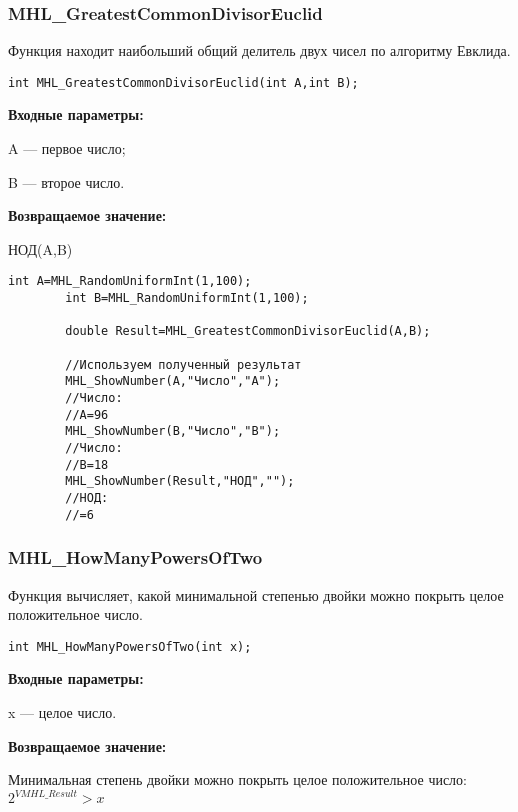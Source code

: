 \documentclass[a4paper,12pt]{article}
\begin{document}
\subsubsection{MHL\_GreatestCommonDivisorEuclid}\label{MHL_GreatestCommonDivisorEuclid}

Функция находит наибольший общий делитель двух чисел по алгоритму Евклида.


\begin{lstlisting}[label=code_syntax_MHL_GreatestCommonDivisorEuclid,caption=Синтаксис]
int MHL_GreatestCommonDivisorEuclid(int A,int B);
\end{lstlisting}

\textbf{Входные параметры:}  
 
A --- первое число;
 
B --- второе число.

\textbf{Возвращаемое значение:}
 
НОД(A,B)


\begin{lstlisting}[label=code_use_MHL_GreatestCommonDivisorEuclid,caption=Пример использования]
        int A=MHL_RandomUniformInt(1,100);
        int B=MHL_RandomUniformInt(1,100);

        double Result=MHL_GreatestCommonDivisorEuclid(A,B);

        //Используем полученный результат
        MHL_ShowNumber(A,"Число","A");
        //Число:
        //A=96
        MHL_ShowNumber(B,"Число","B");
        //Число:
        //B=18
        MHL_ShowNumber(Result,"НОД","");
        //НОД:
        //=6
\end{lstlisting}

\subsubsection{MHL\_HowManyPowersOfTwo}\label{MHL_HowManyPowersOfTwo}

Функция вычисляет, какой минимальной степенью двойки можно покрыть целое положительное число.


\begin{lstlisting}[label=code_syntax_MHL_HowManyPowersOfTwo,caption=Синтаксис]
int MHL_HowManyPowersOfTwo(int x);
\end{lstlisting}

\textbf{Входные параметры:}  
 
x --- целое число.

\textbf{Возвращаемое значение:}
 
 Минимальная степень двойки можно покрыть целое положительное число: $2^{VMHL\_Result}>x$
\end{document}
